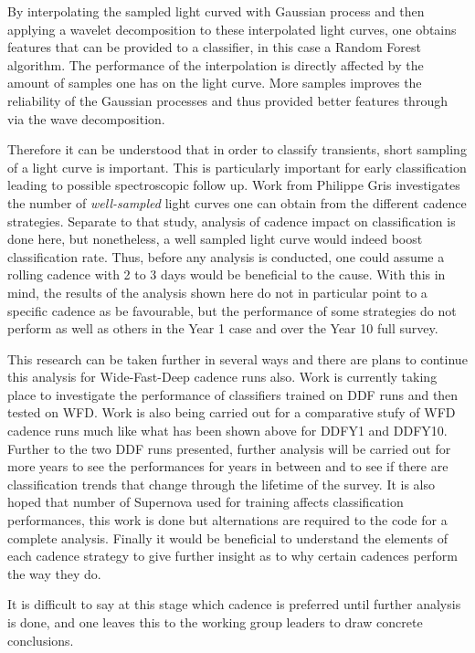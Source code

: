 By interpolating the sampled light curved with Gaussian process and then applying a
wavelet decomposition to these interpolated light curves, one obtains features
that can be provided to a classifier, in this case a Random Forest algorithm.
The performance of the interpolation is directly affected by the amount of
samples one has on the light curve. More samples improves the reliability of the
Gaussian processes and thus provided better features through via the wave decomposition.

Therefore it can be understood that in order to classify transients, short sampling of a light
curve is important. This is particularly important for early classification
leading to possible spectroscopic follow up. Work from Philippe Gris
investigates
the number of \emph{well-sampled} light curves one can obtain from the different
cadence strategies. Separate to that study, analysis of cadence impact on
classification is done here, but nonetheless, a well sampled light curve would
indeed boost classification rate. Thus, before any analysis is conducted, one
could assume a rolling cadence with 2 to 3 days would be beneficial to the
cause.
With this in mind, the results of the analysis shown here do not in particular
point to a specific cadence as be favourable, but the performance of some
strategies do not perform as well as others in the Year 1 case and over the
Year 10 full survey.

This research can be taken further in several ways and there are plans to
continue this analysis for Wide-Fast-Deep cadence runs also. Work is currently
taking place to investigate the performance of classifiers trained on DDF runs
and then tested on WFD. Work is also being carried out for a comparative stufy
of WFD cadence runs much like what has been shown above for DDFY1 and DDFY10.
Further to the two DDF runs presented, further analysis will be carried out for
more years to see the performances for years in between and to see if there
are classification trends that change through the lifetime of the survey. It is
also hoped that number of Supernova used for training affects classification
performances, this work is done but alternations are required to the code for a complete
analysis. Finally it would be beneficial to understand the elements of each cadence
strategy to give further insight as to why certain cadences perform the way they do.


It is difficult to say at this stage which cadence is preferred until further
analysis is done, and one leaves this to the working group leaders to draw
concrete conclusions.
